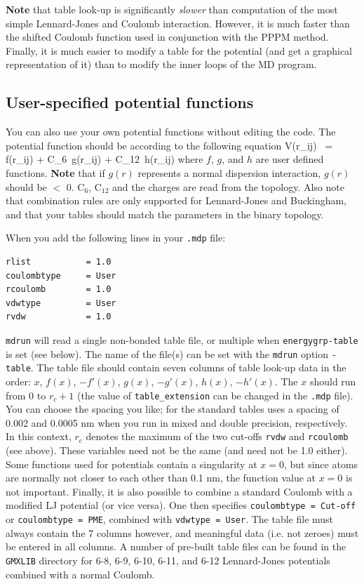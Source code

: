 {\bf Note} that table look-up is significantly {\em
slower} than computation of the most simple Lennard-Jones and Coulomb
interaction. However, it is much faster than the shifted Coulomb
function used in conjunction with the PPPM method. Finally, it is much
easier to modify a table for the potential (and get a graphical
representation of it) than to modify the inner loops of the MD
program.

\subsection{User-specified potential functions}
\label{subsec:userpot}
You can also use your own potential functions without 
editing the {\gromacs} code.  The potential function should be according to the 
following equation
\beq
V(r_{ij}) ~=~  f(r_{ij}) + C_6 \,g(r_{ij}) + C_{12} \,h(r_{ij})
\eeq
where $f$, $g$, and $h$ are user defined functions. {\bf Note} that if $g(r)$ represents a
normal dispersion interaction, $g(r)$ should be $<$ 0. C$_6$, C$_{12}$
and the charges are read from the topology. Also note that combination
rules are only supported for Lennard-Jones and Buckingham, and that
your tables should match the parameters in the binary topology.

When you add the following lines in your {\tt .mdp} file:

{\small
\begin{verbatim}
rlist           = 1.0
coulombtype     = User
rcoulomb        = 1.0
vdwtype         = User
rvdw            = 1.0
\end{verbatim}}

{\tt mdrun} will read a single non-bonded table file,
or multiple when {\tt energygrp-table} is set (see below).
The name of the file(s) can be set with the {\tt mdrun} option {\tt -table}.
The table file should contain seven columns of table look-up data in the
order: $x$, $f(x)$, $-f'(x)$, $g(x)$, $-g'(x)$, $h(x)$, $-h'(x)$.
The $x$ should run from 0 to $r_c+1$ (the value of {\tt table_extension} can be
changed in the {\tt .mdp} file).
You can choose the spacing you like; for the standard tables {\gromacs}
uses a spacing of 0.002 and 0.0005 nm when you run in mixed
and double precision, respectively.  In this
context, $r_c$ denotes the maximum of the two cut-offs {\tt rvdw} and
{\tt rcoulomb} (see above). These variables need not be the same (and
need not be 1.0 either).  Some functions used for potentials contain a
singularity at $x = 0$, but since atoms are normally not closer to each
other than 0.1 nm, the function value at $x = 0$ is not important.
Finally, it is also
possible to combine a standard Coulomb with a modified LJ potential
(or vice versa). One then specifies {\eg} {\tt coulombtype = Cut-off} or
{\tt coulombtype = PME}, combined with {\tt vdwtype = User}.  The table file must
always contain the 7 columns however, and meaningful data (i.e. not
zeroes) must be entered in all columns.  A number of pre-built table
files can be found in the {\tt GMXLIB} directory for 6-8, 6-9, 6-10, 6-11, and 6-12
Lennard-Jones potentials combined with a normal Coulomb.


